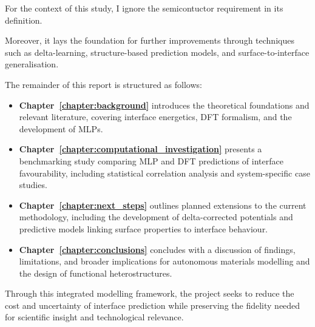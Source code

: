 For the context of this study, I ignore the semicontuctor requirement in its definition.

Moreover, it lays the foundation for further improvements through techniques such as delta-learning, structure-based
prediction models, and surface-to-interface generalisation.

\label{para:report_structure} %

The remainder of this report is structured as follows:

\begin{itemize}

    \item \textbf{Chapter~\ref{chapter:background}} introduces the theoretical foundations and relevant literature,
    covering interface energetics, DFT formalism, and the development of MLPs.

    \item \textbf{Chapter~\ref{chapter:computational_investigation}} presents a benchmarking study comparing MLP and DFT
    predictions of interface favourability, including statistical correlation analysis and system-specific case studies.

    \item \textbf{Chapter~\ref{chapter:next_steps}} outlines planned extensions to the current methodology, including
    the development of delta-corrected potentials and predictive models linking surface properties to interface
    behaviour.

    \item \textbf{Chapter~\ref{chapter:conclusions}} concludes with a discussion of findings, limitations, and broader
    implications for autonomous materials modelling and the design of functional heterostructures.

\end{itemize}

\label{para:framework_objective} %

Through this integrated modelling framework, the project seeks to reduce the cost and uncertainty of interface
prediction while preserving the fidelity needed for scientific insight and technological relevance.
